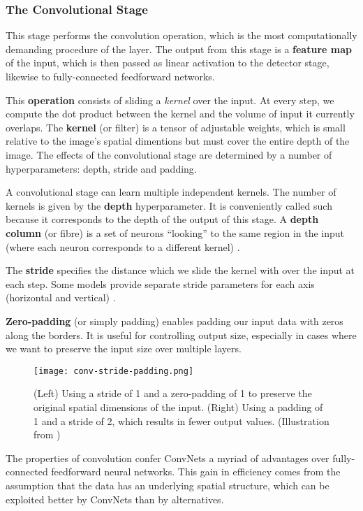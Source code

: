 \subsubsection{The Convolutional Stage}
This stage performs the convolution operation, which is the most computationally demanding procedure of the layer.
The output from this stage is a \textbf{feature map} of the input, which is then passed as linear activation to the detector stage, likewise to fully-connected feedforward networks.

This \textbf{operation} consists of sliding a \emph{kernel} over the input.
At every step, we compute the dot product between the kernel and the volume of input it currently overlaps.
The \textbf{kernel} (or filter) is a tensor of adjustable weights, which is small relative to the image's spatial dimentions but must cover the entire depth of the image.
The effects of the convolutional stage are determined by a number of hyperparameters: depth, stride and padding.

A convolutional stage can learn multiple independent kernels.
The number of kernels is given by the \textbf{depth} hyperparameter.
It is conveniently called such because it corresponds to the depth of the output of this stage.
A \textbf{depth column} (or fibre) \cite{stanford-convnets} is a set of neurons ``looking'' to the same region in the input (where each neuron corresponds to a different kernel) .

The \textbf{stride} specifies the distance which we slide the kernel with over the input at each step.
Some models provide separate stride parameters for each axis (horizontal and vertical) \cite{Goodfellow-et-al-2016}.

\textbf{Zero-padding} (or simply padding) enables padding our input data with zeros along the borders. It is useful for controlling output size, especially in cases where we want to preserve the input size over multiple layers.

\begin{figure}[h]
    \centering
    \texttt{[image: conv-stride-padding.png]}
    \caption{(Left) Using a stride of 1 and a zero-padding of 1 to preserve the original spatial dimensions of the input. (Right) Using a padding of 1 and a stride of 2, which results in fewer output values. (Illustration from \cite{stanford-convnets})}
    \label{fig:conv-stride-padding}
\end{figure}
 
The properties of convolution confer ConvNets a myriad of advantages over fully-connected feedforward neural networks.
This gain in efficiency comes from the assumption that the data has an underlying spatial structure, which can be exploited better by ConvNets than by alternatives.

